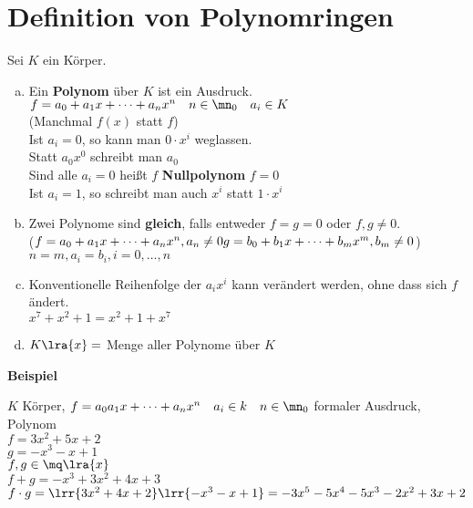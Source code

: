 \section{Definition von Polynomringen}
	Sei $K$ ein Körper.
	\begin{enumerate}[a)]
		\item Ein \textbf{Polynom} über $K$ ist ein Ausdruck.\\
			$f=a_0+a_1x+\dots+a_nx^n\quad n\in\mn_0\quad a_i\in K$\\
			(Manchmal $f(x)$ statt $f$)\\
			Ist $a_i=0$, so kann man $0\cdot x^i$ weglassen.\\
			Statt $a_0x^0$ schreibt man $a_0$\\
			Sind alle $a_i=0$ heißt $f$ \textbf{Nullpolynom} $f=0$\\
			Ist $a_i = 1$, so schreibt man auch $x^i$ statt $1\cdot x^i$
		\item Zwei Polynome sind \textbf{gleich}, falls entweder $f=g=0$ oder $f,g\neq 0$.\\
      ($f=a_0+a_1x+\dots+a_nx^n,a_n\neq 0\\
      g=b_0+b_1x+\dots+b_mx^m,b_m\neq 0$)\\
			$n=m, a_i=b_i, i=0,\dots,n$
		\item Konventionelle Reihenfolge der $a_ix^i$ kann verändert werden, ohne dass sich $f$ ändert.\\
			$x^7+x^2+1=x^2+1+x^7$
		\item $K\lra{x}=$ Menge aller Polynome über $K$
	\end{enumerate}
	\textbf{Beispiel}

	$K$ Körper, $f=a_0a_1x+\dots+a_nx^n\quad a_i\in k\quad n\in\mn_0$ formaler Ausdruck, Polynom\\
	$f=3x^2+5x+2$\\
	$g=-x^3-x+1$\\
	$f,g\in\mq\lra{x}$\\
	$f+g=-x^3+3x^2+4x+3$\\
	$f\cdot g=\lrr{3x^2+4x+2}\lrr{-x^3-x+1}=-3x^5-5x^4-5x^3-2x^2+3x+2$
